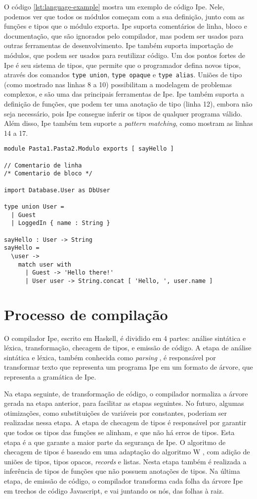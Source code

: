 \documentclass[12pt]{article}
\begin{document}
O código \ref{lst:language-example} mostra um exemplo de código Ipe. Nele, podemos ver que todos os
módulos começam com a sua definição, junto com as funções e tipos que o módulo exporta. Ipe suporta
comentários de linha, bloco e documentação, que são ignorados pelo compilador, mas podem ser usados
para outras ferramentas de desenvolvimento. Ipe também suporta importação de módulos, que podem ser
usados para reutilizar código. Um dos pontos fortes de Ipe é seu sistema de tipos, que permite que o
programador defina novos tipos, através dos comandos \texttt{type union}, \texttt{type opaque} e
\texttt{type alias}. Uniões de tipo (como mostrado nas linhas 8 a 10) possibilitam a modelagem de
problemas complexos, e são uma das principais ferramentas de Ipe. Ipe também suporta a definição de
funções, que podem ter uma anotação de tipo (linha 12), embora não seja necessário, pois Ipe consegue
inferir os tipos de qualquer programa válido. Além disso, Ipe também tem suporte a \textit{pattern matching},
como mostram as linhas 14 a 17.

\begin{lstlisting}[label={lst:language-example},caption={Exemplo de  código Ipe}]
module Pasta1.Pasta2.Modulo exports [ sayHello ]

// Comentario de linha
/* Comentario de bloco */

import Database.User as DbUser

type union User =
  | Guest
  | LoggedIn { name : String }

sayHello : User -> String
sayHello =
  \user ->
    match user with
      | Guest -> 'Hello there!'
      | User user -> String.concat [ 'Hello, ', user.name ]
\end{lstlisting}

\section{Processo de compilação}

O compilador Ipe, escrito em Haskell, é dividido em 4 partes: análise sintática e léxica,
transformação, checagem de tipos, e emissão de código. A etapa de análise sintática e léxica, também
conhecida como \textit{parsing} \cite{dragonbook}, é responsável por transformar texto que representa
um programa Ipe em um formato de árvore, que representa a gramática de Ipe.

Na etapa seguinte, de transformação de código, o compilador normaliza a árvore gerada na etapa anterior,
para facilitar as etapas seguintes. No futuro, algumas otimizações, como substituições de variáveis
por constantes, poderiam ser realizadas nessa etapa. A etapa de checagem de tipos é responsável por
garantir que todos os tipos das funções se alinham, e que não há erros de tipos. Esta etapa é a que
garante a maior parte da segurança de Ipe. O algoritmo de checagem de tipos é baseado em uma adaptação
do algoritmo W \cite{understaingalgorithmw}, com adição de uniões de tipos, tipos opacos,
\textit{records} e listas. Nesta etapa também é realizada a inferência de tipos de funções que não
possuem anotações de tipos. Na última etapa, de emissão de código, o compilador transforma cada folha
da árvore Ipe em trechos de código Javascript, e vai juntando os nós, das folhas à raiz.
\end{document}
